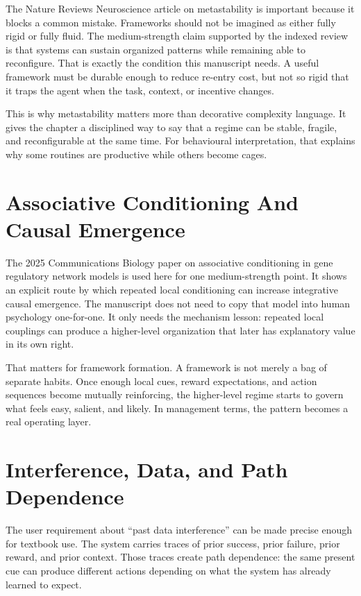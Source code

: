 The Nature Reviews Neuroscience article on metastability is important because
it blocks a common mistake. Frameworks should not be imagined as either fully
rigid or fully fluid. The medium-strength claim supported by the indexed review
is that systems can sustain organized patterns while remaining able to
reconfigure. That is exactly the condition this manuscript needs. A useful
framework must be durable enough to reduce re-entry cost, but not so rigid that
it traps the agent when the task, context, or incentive changes.

This is why metastability matters more than decorative complexity language.
It gives the chapter a disciplined way to say that a regime can be stable,
fragile, and reconfigurable at the same time. For behavioural interpretation,
that explains why some routines are productive while others become cages.

\section{Associative Conditioning And Causal Emergence}

The 2025 Communications Biology paper on associative conditioning in gene
regulatory network models is used here for one medium-strength point. It shows
an explicit route by which repeated local conditioning can increase integrative
causal emergence. The manuscript does not need to copy that model into human
psychology one-for-one. It only needs the mechanism lesson: repeated local
couplings can produce a higher-level organization that later has explanatory
value in its own right.

That matters for framework formation. A framework is not merely a bag of
separate habits. Once enough local cues, reward expectations, and action
sequences become mutually reinforcing, the higher-level regime starts to govern
what feels easy, salient, and likely. In management terms, the pattern becomes
a real operating layer.

\section{Interference, Data, and Path Dependence}

The user requirement about ``past data interference'' can be made precise
enough for textbook use. The system carries traces of prior success, prior
failure, prior reward, and prior context. Those traces create path dependence:
the same present cue can produce different actions depending on what the system
has already learned to expect.

